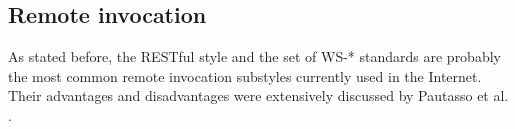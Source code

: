 \subsection{Remote invocation}
\label{sec:remote_invocation}


% 
% 


% 


As stated before, the RESTful style and the set of WS-* standards are probably the most common remote invocation substyles currently used in the Internet.
Their advantages and disadvantages were extensively discussed by Pautasso et al. \cite{pautasso_restful_2008}.


